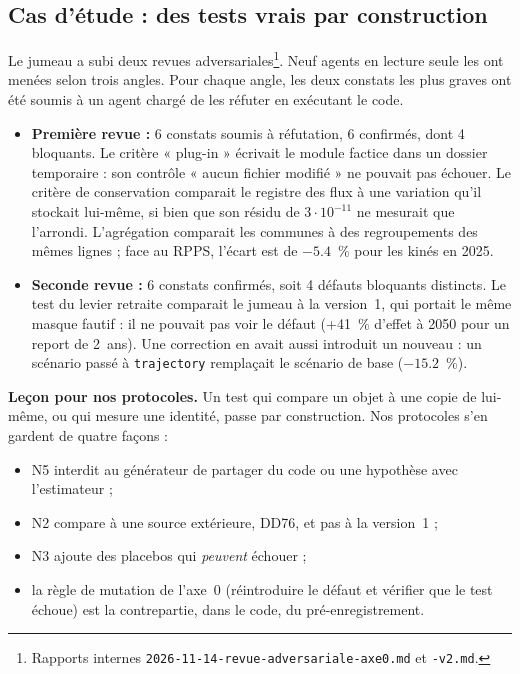 \subsection{Cas d'étude : des tests vrais par construction}
Le jumeau a subi deux revues adversariales\footnote{Rapports internes
\texttt{2026-11-14-revue-adversariale-axe0.md} et \texttt{-v2.md}.}. Neuf agents en lecture seule
les ont menées selon trois angles. Pour chaque angle, les deux constats les plus graves ont été
soumis à un agent chargé de les réfuter en exécutant le code.
\begin{itemize}
  \item \textbf{Première revue :} 6\mesure{} constats soumis à réfutation, 6 confirmés, dont
        4 bloquants. Le critère « plug-in » écrivait le module factice dans un dossier temporaire :
        son contrôle « aucun fichier modifié » ne pouvait pas échouer. Le critère de conservation
        comparait le registre des flux à une variation qu'il stockait lui-même, si bien que son
        résidu de $3 \cdot 10^{-11}$ ne mesurait que l'arrondi. L'agrégation comparait les communes
        à des regroupements des mêmes lignes ; face au RPPS, l'écart est de
        $-\num{5.4}$\mesure{}~\% pour les kinés en 2025.
  \item \textbf{Seconde revue :} 6\mesure{} constats confirmés, soit 4 défauts bloquants
        distincts. Le test du levier retraite comparait le jumeau à la version~1, qui portait le
        même masque fautif : il ne pouvait pas voir le défaut (+41\mesure{}~\% d'effet à 2050 pour un
        report de 2~ans). Une correction en avait aussi introduit un nouveau : un scénario passé à
        \texttt{trajectory} remplaçait le scénario de base ($-\num{15.2}$\mesure{}~\%).
\end{itemize}
\textbf{Leçon pour nos protocoles.} Un test qui compare un objet à une copie de lui-même, ou qui
mesure une identité, passe par construction. Nos protocoles s'en gardent de quatre façons :
\begin{itemize}
  \item N5 interdit au générateur de partager du code ou une hypothèse avec l'estimateur ;
  \item N2 compare à une source extérieure, DD76, et pas à la version~1 ;
  \item N3 ajoute des placebos qui \emph{peuvent} échouer ;
  \item la règle de mutation de l'axe~0 (réintroduire le défaut et vérifier que le test échoue)
        est la contrepartie, dans le code, du pré-enregistrement.
\end{itemize}

